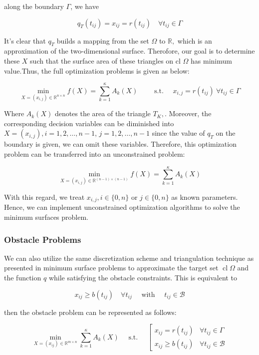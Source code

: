 along the boundary $\Gamma$, we have 

\begin{equation}
q_{T}\left(t_{i j}\right)=x_{i j}=r\left(t_{i j}\right) \quad \forall t_{i j} \in \Gamma
\end{equation}

It's clear that $q_{T}$ builds a mapping from the set $\Omega$ to $\mathbb{R},$ which is an approximation of the two-dimensional surface.
Therofore, our goal is to determine these $X$ such that the surface area of these triangles on cl $\Omega$ has minimum value.Thus, the full optimization problems is given as below:

\begin{equation}
\min _{X=\left(x_{i, j}\right) \in \mathbb{R}^{n \times n}} f(X)=\sum_{k=1}^{\kappa} A_{k}(X) \qquad \text { s.t. } \quad x_{i, j}=r\left(t_{i j}\right) \ \forall t_{i j} \in \Gamma
\end{equation}

Where $A_{k}(X)$ denotes the area of the triangle $T_{K},$. Moreover, the corresponding decision variables can be diminished into $X=\left(x_{i, j}\right), i=1,2, \ldots, n-1$, $j=1,2, \ldots, n-1$
since the value of $q_{T}$ on the boundary is given, we can omit these variables. Therefore, this optimization problem can be transferred into an unconstrained problem:

\begin{equation}
\min _{X=\left(x_{i, j}\right) \in \mathbb{R}^{(n-1) \times(n-1)}} f(X)=\sum_{k=1}^{\kappa} A_{k}(X)
\end{equation}

With this regard, we treat $x_{i, j}, i \in\{0, n\}$ or $j \in\{0, n\}$ as known parameters. Hence, we can implement unconstrained optimization algorithms to solve the minimum surfaces problem.
\subsubsection{Obstacle Problems}
We can also utilize the same discretization scheme and triangulation technique as presented in minimum surface problems to approximate the target set $\operatorname{cl} \Omega$ and the function $q$ while satisfying the obstacle constraints. This is equivalent to 

\begin{equation}
x_{i j} \geq b\left(t_{i j}\right) \quad \forall t_{i j} \quad \text { with } \quad t_{i j} \in \mathcal{B}
\end{equation}

then the obstacle problem can be represented as follows:

\begin{equation}
\min _{X=\left(x_{i j}\right) \in \mathbb{R}^{m \times n}} \sum_{k=1}^{\kappa} A_{k}(X) \quad \text { s.t. } \quad\left[\begin{array}{ll}
x_{i j}=r\left(t_{i j}\right) & \forall t_{i j} \in \Gamma \\
x_{i j} \geq b\left(t_{i j}\right) & \forall t_{i j} \in \mathcal{B}
\end{array}\right.
\end{equation}


